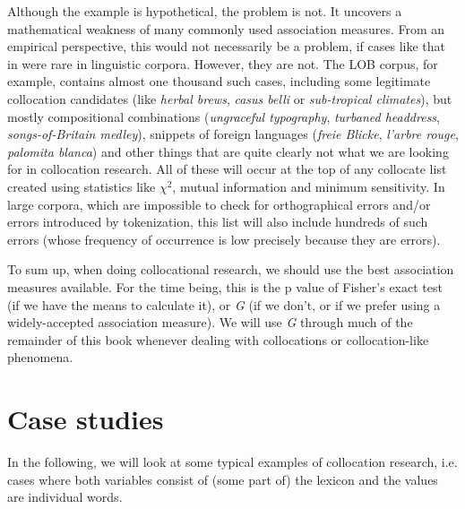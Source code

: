 Although the example is hypothetical, the problem is not. It uncovers a mathematical weakness of many commonly used association  measures.  From an empirical perspective, this would not necessarily be a problem, if cases like that in  were rare in linguistic corpora. However, they are not. The LOB  corpus, for example, contains almost one thousand such cases, including some legitimate collocation  candidates (like \textit{herbal brews}, \textit{casus belli} or \textit{sub\hyp{}tropical climates}), but mostly compositional  combinations (\textit{ungraceful typography}, \textit{turbaned headdress}, \textit{songs\hyp{}of\hyp{}Britain medley}), snippets of foreign languages (\textit{freie Blicke}, \textit{l'arbre rouge}, \textit{palomita blanca}) and other things that are quite clearly not what we are looking for in collocation research. All of these will occur at the top of any collocate  list created using statistics  like $\chi^2$,  mutual information  and minimum sensitivity.  In large  corpora, which are impossible to check for orthographical errors and\slash or errors introduced by tokenization,  this list will also include hundreds of such errors (whose frequency  of occurrence is low precisely because they are errors).

To sum up, when doing collocational  research, we should use the best association  measures  available. For the time being, this is the p value of Fisher's exact test  (if we have the means to calculate it), or \emph{G}  (if we don't, or if we prefer using a widely\hyp{}accepted association measure). We will use \emph{G} through much of the remainder of this book whenever dealing with collocations or collocation\hyp{}like phenomena.

\section{Case studies}
\label{sec:collocatescasestudies}

In the following, we will look at some typical examples of collocation  research, i.e. cases where both variables consist of (some part of) the lexicon  and the values are individual words.

